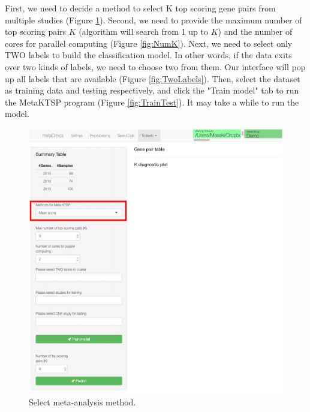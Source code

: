 First, we need to decide a method to select K top scoring gene pairs from multiple studies (Figure \ref{fig:MethodSelect}). Second, we need to provide the maximum number of top scoring pairs $K$ (algorithm will search from 1 up to $K$) and the number of cores for parallel computing (Figure \ref{fig:NumK}). Next, we need to select only TWO labels to build the classification model. In other words, if the data exits over two kinds of labels, we need to choose two from them. Our interface will pop up all labels that are available (Figure \ref{fig:TwoLabels}). Then, select the dataset as training data and testing respectively, and click the "Train model" tab to run the MetaKTSP program  (Figure \ref{fig:TrainTest}). It may take a while to run the model.

\begin{figure}[H]
\begin{center}
\includegraphics[scale=0.7]{./figure/MetaKTSP/Figure5.pdf}
\caption{Select meta-analysis method.}
\label{fig:MethodSelect}
\end{center}
\end{figure}

